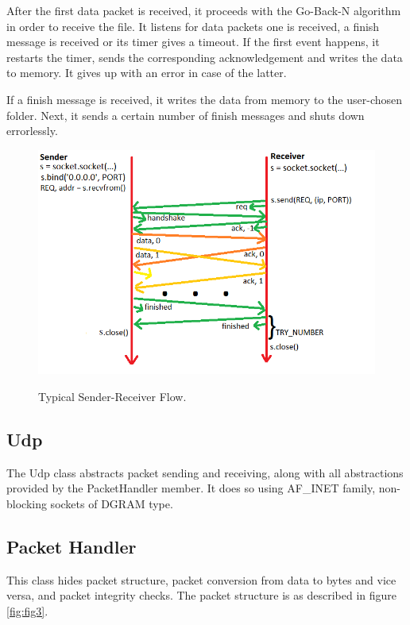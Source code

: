 \documentclass[12pt]{article}
\begin{document}
After the first data packet is received, it proceeds with the Go-Back-N algorithm in order to receive the file. It listens for data packets one is received, a finish message is received or its timer gives a timeout. If the first event happens, it restarts the timer, sends the corresponding acknowledgement and writes the data to memory. It gives up with an error in case of the latter.

If a finish message is received, it writes the data from memory to the user-chosen folder. Next, it sends a certain number of finish messages and shuts down errorlessly.

\begin{figure}[h!]
	\caption{Typical Sender-Receiver Flow.}
	\centering
	\includegraphics[width=\linewidth]{Flow.png}
	\label{fig:fig2}
\end{figure}

\subsection{Udp}

The Udp class abstracts packet sending and receiving, along with all abstractions provided by the PacketHandler member. It does so using AF_INET family, non-blocking sockets of DGRAM type.

\subsection{Packet Handler}

This class hides packet structure, packet conversion from data to bytes and vice versa, and packet integrity checks. The packet structure is as described in figure  \ref{fig:fig3}.
\end{document}
